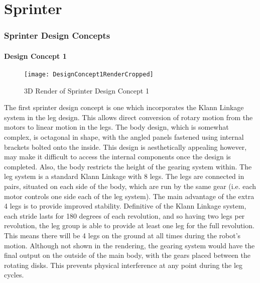\clearpage
\part{Sprinter}
\label{part:sprinter}

\section{Sprinter Design Concepts}
\label{sec:Sprinter Design Concepts}
  \subsection{Design Concept 1}
  \label{sub:Design Concept 1}
    \begin{figure}[H]
    \label{fig:3dConcept1}
      \begin{center}
        \texttt{[image: DesignConcept1RenderCropped]}
        \caption{3D Render of Sprinter Design Concept 1}
      \end{center}
    \end{figure}

    The first sprinter design concept is one which incorporates the Klann Linkage system in the leg design. This allows direct conversion of rotary motion from the motors to linear motion in the legs. The body design, which is somewhat complex, is octagonal in shape, with the angled panels fastened using internal brackets bolted onto the inside. This design is aesthetically appealing however, may make it difficult to access the internal components once the design is completed.  Also, the body restricts the height of the gearing system within. The leg system is a standard Klann Linkage with 8 legs. The legs are connected in pairs, situated on each side of the body, which are run by the same gear (i.e. each motor controls one side each of the leg system).  The main advantage of the extra 4 legs is to provide improved stability. Definitive of the Klann Linkage system, each stride lasts for 180 degrees of each revolution, and so having two legs per revolution, the leg group is able to provide at least one leg for the full revolution. This means there will be 4 legs on the ground at all times during the robot's motion. Although not shown in the rendering, the gearing system would have the final output on the outside of the main body, with the gears placed between the rotating disks. This prevents physical interference at any point during the leg cycles.\\

